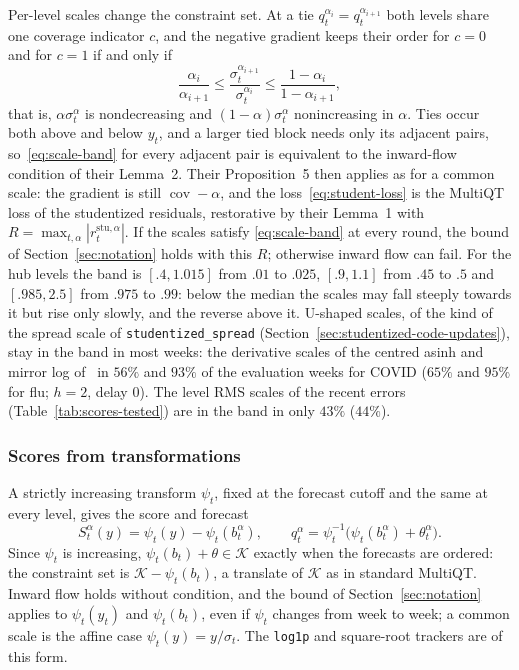 \documentclass[11pt,a4paper]{article}
\newcommand{\K}{\mathcal{K}}
\newcommand{\stu}{\mathrm{stu}}
\DeclareMathOperator{\cov}{cov}
\theoremstyle{definition}
\theoremstyle{remark}
\begin{document}
Per-level scales change the constraint set. At a tie
$q_t^{\alpha_i}=q_t^{\alpha_{i+1}}$ both levels share one coverage
indicator $c$, and the negative gradient keeps their order for $c=0$ and
for $c=1$ if and only if
\begin{equation}
 \frac{\alpha_i}{\alpha_{i+1}}\le
 \frac{\sigma_t^{\alpha_{i+1}}}{\sigma_t^{\alpha_i}}\le
 \frac{1-\alpha_i}{1-\alpha_{i+1}},
 \label{eq:scale-band}
\end{equation}
that is, $\alpha\sigma_t^\alpha$ is nondecreasing and
$(1-\alpha)\sigma_t^\alpha$ nonincreasing in $\alpha$. Ties occur both
above and below $y_t$, and a larger tied block needs only its adjacent
pairs, so~\eqref{eq:scale-band} for every adjacent pair is equivalent to
the inward-flow condition of their Lemma~2. Their Proposition~5 then
applies as for a common scale: the gradient is still $\cov-\alpha$, and
the loss~\eqref{eq:student-loss} is the MultiQT loss of the studentized
residuals, restorative by their Lemma~1 with
$R=\max_{t,\alpha}|r_t^{\stu,\alpha}|$. If the scales satisfy
\eqref{eq:scale-band} at every round, the bound of
Section~\ref{sec:notation} holds with this $R$; otherwise inward flow can
fail. For the hub levels the band is $[.4,1.015]$ from $.01$ to $.025$,
$[.9,1.1]$ from $.45$ to $.5$ and $[.985,2.5]$ from $.975$ to $.99$:
below the median the scales may fall steeply towards it but rise only
slowly, and the reverse above it. U-shaped scales, of the kind of the
spread scale of \texttt{studentized\_spread}
(Section~\ref{sec:studentized-code-updates}), stay in the band in most
weeks: the derivative scales of the centred asinh and mirror log
of~\cite{vst} in $56\%$ and $93\%$ of the evaluation weeks for COVID ($65\%$
and $95\%$ for flu; $h=2$, delay 0). The level RMS scales of the recent
errors (Table~\ref{tab:scores-tested}) are in the band in only $43\%$ ($44\%$).

\subsubsection{Scores from transformations}
\label{sec:transform-scores}
A strictly increasing transform $\psi_t$, fixed at the forecast cutoff
and the same at every level, gives the score and forecast
\begin{equation}
 S_t^\alpha(y)=\psi_t(y)-\psi_t(b_t^\alpha),\qquad
 q_t^\alpha=\psi_t^{-1}\bigl(\psi_t(b_t^\alpha)+\theta_t^\alpha\bigr).
 \label{eq:transform-score}
\end{equation}
Since $\psi_t$ is increasing, $\psi_t(b_t)+\theta\in\K$ exactly when the
forecasts are ordered: the constraint set is $\K-\psi_t(b_t)$, a translate
of $\K$ as in standard MultiQT. Inward flow holds without condition, and
the bound of Section~\ref{sec:notation} applies to $\psi_t(y_t)$ and
$\psi_t(b_t)$, even if $\psi_t$ changes from week to week; a common scale
is the affine case $\psi_t(y)=y/\sigma_t$. The \texttt{log1p} and
square-root trackers are of this form.
\end{document}
